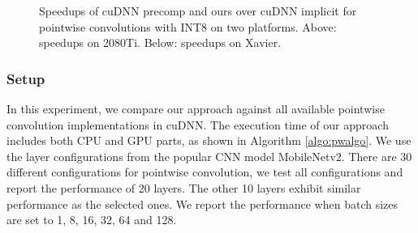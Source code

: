 \begin{figure}
\captionsetup[subfloat]{labelformat=empty,skip=0pt}

	\centering
	\vspace{-5mm}
	\vspace{-6mm}
	\caption{Speedups of cuDNN precomp and ours over cuDNN implicit for pointwise convolutions with INT8 on two platforms. Above: speedups on 2080Ti. Below: speedups on Xavier.}
	\label{fig:pwspeedupint8}
\end{figure}

%	


\subsubsection{Setup} In this experiment, we compare our approach against all available pointwise convolution implementations in cuDNN.
The execution time of our approach includes both CPU and GPU parts, as shown in Algorithm \ref{algo:pwalgo}.
We use the layer configurations from the popular CNN model MobileNetv2.
There are 30 different configurations for pointwise convolution, we test all configurations and report the performance of 20 layers.
The other 10 layers exhibit similar performance as the selected ones.
We report the performance when batch sizes are set to 1, 8, 16, 32, 64 and 128.

